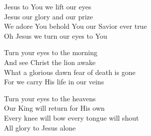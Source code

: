 \documentclass[aspectratio=169]{beamer}
\begin{document}
{\begin{frame}{}
\end{frame}
\hypertarget{Turn your eyes upon Jesus[]C}{}
\begin{frame}{}
\fontsize{19.148936170212767}{22.97872340425532}\selectfont

Jesus to You we lift our eyes\\ 
Jesus our glory and our prize\\ 
We adore You behold You our Savior ever true\\ 
Oh Jesus we turn our eyes to You

\end{frame}
\hypertarget{Turn your eyes upon Jesus[]3}{}
\begin{frame}{}
\fontsize{19.148936170212767}{22.97872340425532}\selectfont

Turn your eyes to the morning\\ 
And see Christ the lion awake\\ 
What a glorious dawn fear of death is gone\\ 
For we carry His life in our veins

\end{frame}
\hypertarget{Turn your eyes upon Jesus[]4}{}
\begin{frame}{}
\fontsize{19.148936170212767}{22.97872340425532}\selectfont

Turn your eyes to the heavens\\ 
Our King will return for His own\\ 
Every knee will bow every tongue will shout\\ 
All glory to Jesus alone

\end{frame}
}
\end{document}
